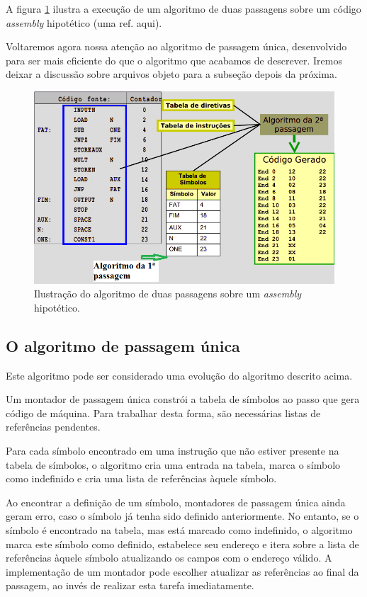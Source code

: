 A figura \ref{duas_passagens} ilustra a execução de um algoritmo de duas passagens sobre um código \textit{assembly} hipotético (uma ref. aqui).

Voltaremos agora nossa atenção ao algoritmo de passagem única, desenvolvido para ser mais eficiente do que o algoritmo que acabamos de descrever. Iremos deixar a discussão sobre arquivos objeto para a subseção depois da próxima.

\begin{figure}[ptb]
  \begin{center}
    \includegraphics[scale=.7]{imagens/duas_passagens}
  \end{center}
  \caption{Ilustração do algoritmo de duas passagens sobre um \textit{assembly} hipotético.}
  \label{duas_passagens}
\end{figure}

\subsection{O algoritmo de passagem única}

Este algoritmo pode ser considerado uma evolução do algoritmo descrito acima.

Um montador de passagem única constrói a tabela de símbolos ao passo que gera código de máquina. Para trabalhar desta forma, são necessárias listas de referências pendentes.

Para cada símbolo encontrado em uma instrução que não estiver presente na tabela de símbolos, o algoritmo cria uma entrada na tabela, marca o símbolo como indefinido e cria uma lista de referências àquele símbolo.

Ao encontrar a definição de um símbolo, montadores de passagem única ainda geram erro, caso o símbolo já tenha sido definido anteriormente. No entanto, se o símbolo é encontrado na tabela, mas está marcado como indefinido, o algoritmo marca este símbolo como definido, estabelece seu endereço e itera sobre a lista de referências àquele símbolo atualizando os campos com o endereço válido. A implementação de um montador pode escolher atualizar as referências ao final da passagem, ao invés de realizar esta tarefa imediatamente.

